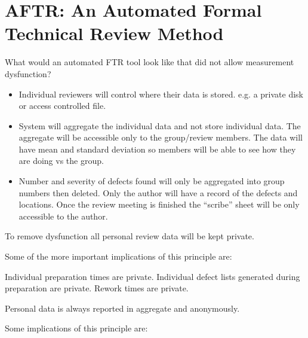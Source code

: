 
\section{AFTR:  An Automated Formal Technical Review Method}
\label{sec:AFTR}



What would an automated FTR tool look like that did not allow measurement
dysfunction?

\begin{itemize}
\item{Individual reviewers will control where their data is stored.  e.g. a
private disk or access controlled file.}
\item{System will aggregate the individual data and not store individual
data.  The aggregate will be accessible only to the group/review members.
The data will have mean and standard deviation so members will be able to
see how they are doing vs the group.}
\item{Number and severity of defects found will only be aggregated into
group numbers then deleted.  Only the author will have a record of the
defects and locations.  Once the review meeting is finished the ``scribe''
sheet will be only accessible to the author.}

\end{itemize} 



To remove dysfunction all personal review data will be kept private. 

Some of the more important implications of this principle are: 

      Individual preparation times are private. 
      Individual defect lists generated during preparation are private. 
      Rework times are private. 

Personal data is always reported in aggregate and anonymously.


Some implications of this principle are: 

